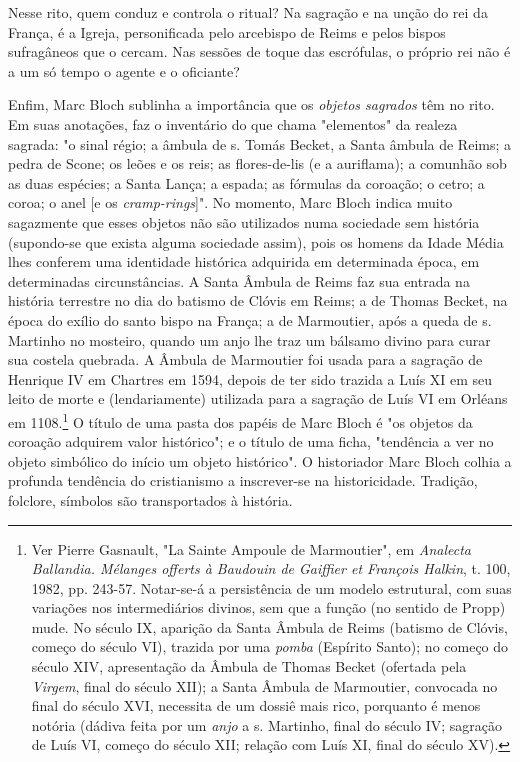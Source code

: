 \documentclass[a5paper]{book}
\begin{document}
Nesse rito, quem conduz e controla o ritual? Na sagração e na unção do rei da França, é a Igreja, personif{\kern0pt}icada pelo arcebispo de Reims e pelos bispos sufragâneos que o cercam. Nas sessões de toque das escrófulas, o próprio rei não é a um só tempo o agente e o of{\kern0pt}iciante?

Enf{\kern0pt}im, Marc Bloch sublinha a importância que os \textit{objetos sagrados} têm no rito. Em suas anotações, faz o inventário do que chama "elementos" da realeza sagrada: "o sinal régio; a âmbula de s. Tomás Becket, a Santa âmbula de Reims; a pedra de Scone; os leões e os reis; as f{\kern0pt}lores-de-lis (e a aurif{\kern0pt}lama); a comunhão sob as duas espécies; a Santa Lança; a espada; as fórmulas da coroação; o cetro; a coroa; o anel [e os \textit{cramp-rings}]". No momento, Marc Bloch indica muito sagazmente que esses objetos não são utilizados numa sociedade sem história (supondo-se que exista alguma sociedade assim), pois os homens da Idade Média lhes conferem uma identidade histórica adquirida em determinada época, em determinadas circunstâncias. A Santa Âmbula de Reims faz sua entrada na história terrestre no dia do batismo de Clóvis em Reims; a de Thomas Becket, na época do exílio do santo bispo na França; a de Marmoutier, após a queda de s. Martinho no mosteiro, quando um anjo lhe traz um bálsamo divino para curar sua costela quebrada. A Âmbula de Marmoutier foi usada para a sagração de Henrique IV em Chartres em 1594, depois de ter sido trazida a Luís XI em seu leito de morte e (lendariamente) utilizada para a sagração de Luís VI em Orléans em 1108.\footnote{Ver Pierre Gasnault, "La Sainte Ampoule de Marmoutier", em \textit{Analecta Ballandia. Mélanges of{\kern0pt}ferts à Baudouin de Gaif{\kern0pt}f{\kern0pt}ier et François Halkin}, t. 100, 1982, pp. 243-57. Notar-se-á a persistência de um modelo estrutural, com suas variações nos intermediários divinos, sem que a função (no sentido de Propp) mude. No século IX, aparição da Santa Âmbula de Reims (batismo de Clóvis, começo do século VI), trazida por uma \textit{pomba} (Espírito Santo); no começo do século XIV, apresentação da Âmbula de Thomas Becket (ofertada pela \textit{Virgem}, f{\kern0pt}inal do século XII); a Santa Âmbula de Marmoutier, convocada no f{\kern0pt}inal do século XVI, necessita de um dossiê mais rico, porquanto é menos notória (dádiva feita por um \textit{anjo} a s. Martinho, f{\kern0pt}inal do século IV; sagração de Luís VI, começo do século XII; relação com Luís XI, f{\kern0pt}inal do século XV).} O título de uma pasta dos papéis de Marc Bloch é "os objetos da coroação adquirem valor histórico"; e o título de uma f{\kern0pt}icha, "tendência a ver no objeto simbólico do início um objeto histórico". O historiador Marc Bloch colhia a profunda tendência do cristianismo a inscrever-se na historicidade. Tradição, folclore, símbolos são transportados à história.
\end{document}
